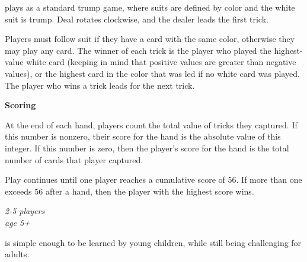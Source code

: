 \documentclass[11pt]{article}
\newcommand\myssection[1]{\begin{center}\bf\small\noindent #1\end{center}}
\begin{document}
 plays as a standard trump game, where
suits are defined by color and the white suit is trump.  Deal rotates
clockwise, and the dealer leads the first trick.

Players must follow suit if they have a card with the same color,
otherwise they may play any card.  The winner of each trick is the
player who played the highest-value white card (keeping in mind that
positive values are greater than negative values), or the highest
card in the color that was led if no white card was played.  The player
who wins a trick leads for the next trick.

\clearpage
{}

\myssection{Scoring} At the end of each hand, players count the
total value of tricks they captured.  If this number is nonzero, their
score for the hand is the absolute value of this integer.  If this
number is zero, then the player's score for the hand is the total
number of cards that player captured.

Play continues until one player reaches a cumulative score of 56.  If
more than one exceeds 56 after a hand, then the player with the
highest score wins.

\clearpage
{}

\vspace{-0.2in}
\begin{center}
  \em 2-5 players\\
  age 5+
\end{center}

 is simple enough to be learned by young
children, while still being challenging for adults.
\end{document}
